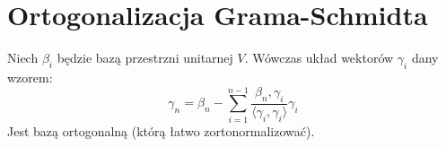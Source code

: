 \section{Ortogonalizacja Grama-Schmidta}


\begin{theorem}
    Niech $\beta_i$ będzie bazą przestrzni unitarnej $V$. Wówczas układ wektorów $\gamma_i$ dany wzorem:
    \begin{equation*}
        \gamma_n = \beta_n - \sum_{i=1}^{n-1} \frac{\beta_n, \gamma_i}{\langle \gamma_i, \gamma_i \rangle} \gamma_i 
    \end{equation*}
    Jest bazą ortogonalną (którą łatwo zortonormalizować).
\end{theorem}